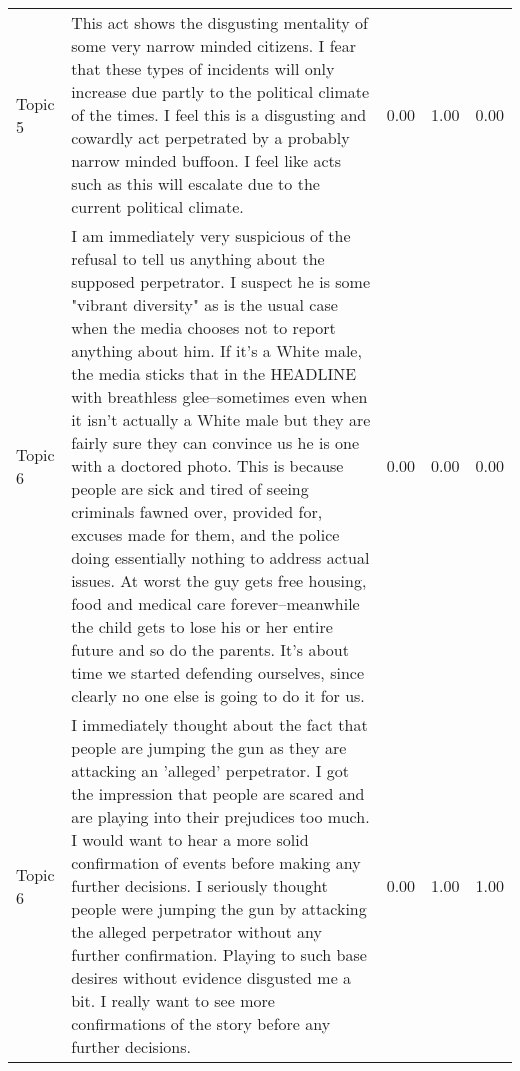 \begin{table}[ht]
\begin{tabular}{llrrr}
  Topic 5 & This act shows the disgusting mentality of some very narrow minded citizens. I fear that these types of incidents will only increase due partly to the political climate of the times. I feel this is a disgusting and cowardly act perpetrated by a probably narrow minded buffoon. I feel like acts such as this will escalate due to the current political climate.  & 0.00 & 1.00 & 0.00 \\ 
  Topic 6 & I am immediately very suspicious of the refusal to tell us anything about the supposed perpetrator. I suspect he is some "vibrant diversity" as is the usual case when the media chooses not to report anything about him. If it's a White male, the media sticks that in the HEADLINE with breathless glee--sometimes even when it isn't actually a White male but they are fairly sure they can convince us he is one with a doctored photo. This is because people are sick and tired of seeing criminals fawned over, provided for, excuses made for them, and the police doing essentially nothing to address actual issues. At worst the guy gets free housing, food and medical care forever--meanwhile the child gets to lose his or her entire future and so do the parents. It's about time we started defending ourselves, since clearly no one else is going to do it for us. & 0.00 & 0.00 & 0.00 \\ 
  Topic 6 & I immediately thought about the fact that people are jumping the gun as they are attacking an 'alleged' perpetrator. I got the impression that people are scared and are playing into their prejudices too much. I would want to hear a more solid confirmation of events before making any further decisions. I seriously thought people were jumping the gun by attacking the alleged perpetrator without any further confirmation. Playing to such base desires without evidence disgusted me a bit. I really want to see more confirmations of the story before any further decisions. & 0.00 & 1.00 & 1.00 \\ 
   \hline
\end{tabular}
\end{table}
